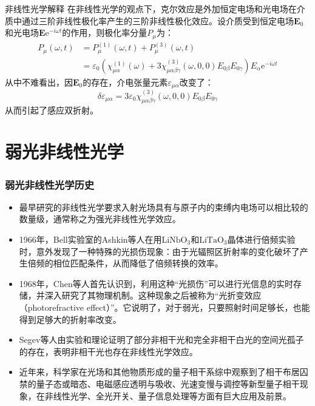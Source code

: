 \documentclass{beamer}
\renewcommand\epsilon{\varepsilon}
\renewcommand{\bm}{\symbf}
\newenvironment{slide}{
    \begin{frame}{\bfseries{\sectiontitle}}
}{
    \end{frame}
}
\let\sectiononly\section
\renewcommand{\section}[1]{
    \sectiononly{#1}
    \let\sectiontitle\relax
    \newcommand{\sectiontitle}{#1}
}
\begin{document}
\begin{slide}{非线性光学解释}
    在非线性光学的观点下，克尔效应是外加恒定电场和光电场在介质中通过三阶非线性极化率产生的三阶非线性极化效应。设介质受到恒定电场$\bm{E}_0$和光电场$\bm{E}\mathrm{e}^{-i\omega t}$的作用，则极化率分量$P_\mu$为：
    \begin{align*}
        P_\mu(\omega, t)
        &= P_\mu^{(1)}(\omega, t) + P_\mu^{(3)}(\omega, t) \\
        &= \epsilon_0\left(\chi^{(1)}_{\mu\alpha}(\omega) + 3\chi^{(3)}_{\mu\alpha\beta\gamma}(\omega, 0, 0) E_{0\beta} E_{0\gamma}\right)E_\alpha \mathrm{e}^{-i\omega t}
    \end{align*}
    从中不难看出，因$\bm{E}_0$的存在，介电张量元素$\epsilon_{\mu\alpha}$改变了：
    \[
        \delta\epsilon_{\mu\alpha} = 3\epsilon_0\chi^{(3)}_{\mu\alpha\beta\gamma}(\omega, 0, 0)E_{0\beta}E_{0\gamma}
    \]
    从而引起了感应双折射。
\end{slide}

\part{弱光非线性光学}

\begin{frame}
    \partpage
    \tableofcontents
\end{frame}

\section{弱光非线性光学历史}

\begin{slide}
    \footnotesize{
    \begin{itemize}
        \item 最早研究的非线性光学要求入射光场具有与原子内的束缚内电场可以相比较的数量级，通常称之为强光非线性光学效应。

        \item 1966年，Bell实验室的Ashkin等人在用$\mathrm{LiNbO_3}$和$\mathrm{LiTaO_3}$晶体进行倍频实验时，意外发现了一种特殊的光损伤现象：由于光辐照区折射率的变化破坏了产生倍频的相位匹配条件，从而降低了倍频转换的效率。

        \item 1968年，Chen等人首先认识到，利用这种“光损伤”可以进行光信息的实时存储，并深入研究了其物理机制。这种现象之后被称为“光折变效应（photorefractive effect）”。它说明了，对于弱光，只要照射时间足够长，也能得到足够大的折射率改变。

        \item Segev等人由实验和理论证明了部分非相干光和完全非相干白光的空间光孤子的存在，表明非相干光也存在非线性光学效应。

        \item 近年来，科学家在光场和其他物质形成的量子相干系综中观察到了相干布居囚禁的量子态或暗态、电磁感应透明与吸收、光速变慢与调控等新型量子相干现象，在非线性光学、全光开关、量子信息处理等方面有巨大应用及前景。
    \end{itemize}
    }
\end{slide}
\end{document}
